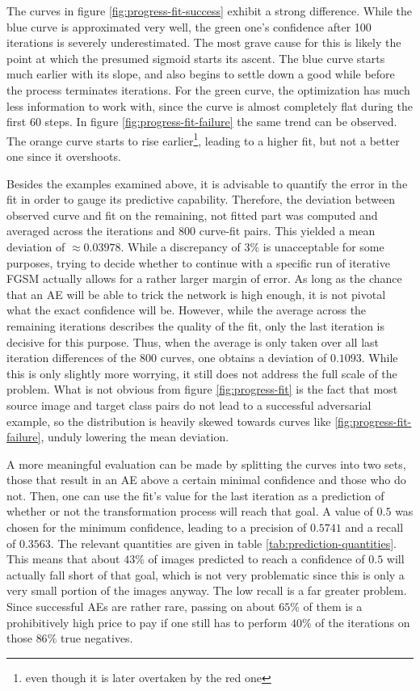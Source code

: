 \documentclass[11pt, a4paper]{article}
\begin{document}
The curves in figure \ref{fig:progress-fit-success} exhibit a strong difference. While the blue curve is approximated very well, the green one's confidence after 100 iterations is severely underestimated. The most grave cause for this is likely the point at which the presumed sigmoid starts its ascent. The blue curve starts much earlier with its slope, and also begins to settle down a good while before the process terminates iterations. For the green curve, the optimization has much less information to work with, since the curve is almost completely flat during the first 60 steps. In figure \ref{fig:progress-fit-failure} the same trend can be observed. The orange curve starts to rise earlier\footnote{even though it is later overtaken by the red one}, leading to a higher fit, but not a better one since it overshoots.

Besides the examples examined above, it is advisable to quantify the error in the fit in order to gauge its predictive capability. Therefore, the deviation between observed curve and fit on the remaining, not fitted part was computed and averaged across the iterations and 800 curve-fit pairs. This yielded a mean deviation of $\approx 0.03978$. While a discrepancy of $3\%$ is unacceptable for some purposes, trying to decide whether to continue with a specific run of iterative FGSM actually allows for a rather larger margin of error. As long as the chance that an AE will be able to trick the network is high enough, it is not pivotal what the exact confidence will be. However, while the average across the remaining iterations describes the quality of the fit, only the last iteration is decisive for this purpose. Thus, when the average is only taken over all last iteration differences of the 800 curves, one obtains a deviation of $0.1093$. While this is only slightly more worrying, it still does not address the full scale of the problem. What is not obvious from figure \ref{fig:progress-fit} is the fact that most source image and target class pairs do not lead to a successful adversarial example, so the distribution is heavily skewed towards curves like \ref{fig:progress-fit-failure}, unduly lowering the mean deviation.

A more meaningful evaluation can be made by splitting the curves into two sets, those that result in an AE above a certain minimal confidence and those who do not. Then, one can use the fit's value for the last iteration as a prediction of whether or not the transformation process will reach that goal. A value of $0.5$ was chosen for the minimum confidence, leading to a precision of $0.5741$ and a recall of $0.3563$. The relevant quantities are given in table \ref{tab:prediction-quantities}. This means that about $43\%$ of images predicted to reach a confidence of $0.5$ will actually fall short of that goal, which is not very problematic since this is only a very small portion of the images anyway. The low recall is a far greater problem. Since successful AEs are rather rare, passing on about $65\%$ of them is a prohibitively high price to pay if one still has to perform $40\%$ of the iterations on those $86\%$ true negatives.
\end{document}
